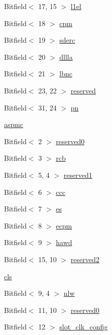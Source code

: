 \begin{DoxyCompactItemize}
Bitfield$<$ 17, 15 $>$ \hyperlink{structPXCAP_a5643f0273bad7b52fa6cccbdcf99acf7}{l1el}
\item 
Bitfield$<$ 18 $>$ \hyperlink{structPXCAP_a862fc55bc27a3604ebfe753859672646}{cpm}
\item 
Bitfield$<$ 19 $>$ \hyperlink{structPXCAP_ac0cfe244b0d2d90b6eea524209d89aba}{sderc}
\item 
Bitfield$<$ 20 $>$ \hyperlink{structPXCAP_a340127b8ad94dbc7673a1e6edb1a6b2c}{dllla}
\item 
Bitfield$<$ 21 $>$ \hyperlink{structPXCAP_a94f01ca59d197ed7dfb03f8a9acd9caf}{lbnc}
\item 
Bitfield$<$ 23, 22 $>$ \hyperlink{structPXCAP_a7fc1b3e23b7aeb9dc08c2510de0e7dd5}{reserved}
\item 
Bitfield$<$ 31, 24 $>$ \hyperlink{structPXCAP_ab5c9dfc9fb9844f3b5c4c0268fdc855b}{pn}
\item 
\hyperlink{structPXCAP_acfd19d41907e65e1f9c9ea27c628e1b8}{aspmc}
\item 
Bitfield$<$ 2 $>$ \hyperlink{structPXCAP_a3a000414676bb935cf6ecf353ef1895e}{reserved0}
\item 
Bitfield$<$ 3 $>$ \hyperlink{structPXCAP_a9b208f50813afe40322733470e1a737b}{rcb}
\item 
Bitfield$<$ 5, 4 $>$ \hyperlink{structPXCAP_aeac9bcbee49459263a8b4114cb899822}{reserved1}
\item 
Bitfield$<$ 6 $>$ \hyperlink{structPXCAP_a2b2844ff23f0c7f2530a64e575b8f07f}{ccc}
\item 
Bitfield$<$ 7 $>$ \hyperlink{structPXCAP_a7e8c03b5cbaf93f3d6ad3ce924e920a2}{es}
\item 
Bitfield$<$ 8 $>$ \hyperlink{structPXCAP_ad0a4018e9cb3885a316ac36e1535eed4}{ecpm}
\item 
Bitfield$<$ 9 $>$ \hyperlink{structPXCAP_abd1874c5fb0d8108fc13e7481d6388f3}{hawd}
\item 
Bitfield$<$ 15, 10 $>$ \hyperlink{structPXCAP_a6546e92118d406e7009f144b14542c87}{reserved2}
\item 
\hyperlink{structPXCAP_a5111f8f1b8eef28b2f15aa7dff548677}{cls}
\item 
Bitfield$<$ 9, 4 $>$ \hyperlink{structPXCAP_aac5b62bea7f56021598824cd37da8e63}{nlw}
\item 
Bitfield$<$ 11, 10 $>$ \hyperlink{structPXCAP_abfe65afb55f4825284f66e53bc78104a}{reserved0}
\item 
Bitfield$<$ 12 $>$ \hyperlink{structPXCAP_a1eac51ed17f8d24850f6da7d50c69444}{slot\_\-clk\_\-config}
\item 

\end{DoxyCompactItemize}
